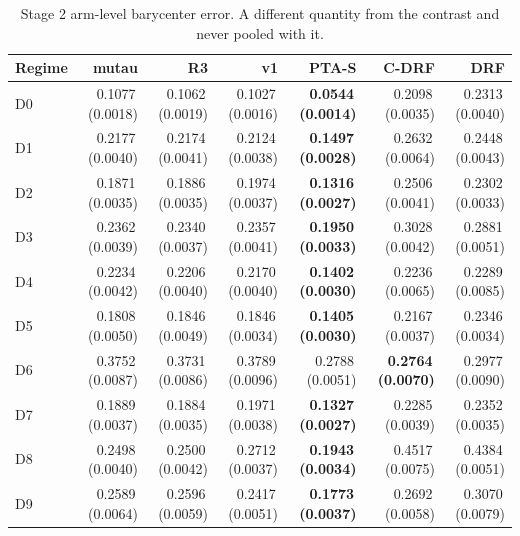 \begin{table}[htbp]
\centering
\caption{Stage 2 arm-level barycenter error. A different quantity from the contrast and never pooled with it.}
\label{tab:p55s2-bary}
\scriptsize
\setlength{\tabcolsep}{3.2pt}
\begin{tabular}{@{}lrrrrrr@{}}
\toprule
Regime & mutau & R3 & v1 & PTA-S & C-DRF & DRF \\
\midrule
D0 & 0.1077\,(0.0018) & 0.1062\,(0.0019) & 0.1027\,(0.0016) & \textbf{0.0544\,(0.0014)} & 0.2098\,(0.0035) & 0.2313\,(0.0040) \\
D1 & 0.2177\,(0.0040) & 0.2174\,(0.0041) & 0.2124\,(0.0038) & \textbf{0.1497\,(0.0028)} & 0.2632\,(0.0064) & 0.2448\,(0.0043) \\
D2 & 0.1871\,(0.0035) & 0.1886\,(0.0035) & 0.1974\,(0.0037) & \textbf{0.1316\,(0.0027)} & 0.2506\,(0.0041) & 0.2302\,(0.0033) \\
D3 & 0.2362\,(0.0039) & 0.2340\,(0.0037) & 0.2357\,(0.0041) & \textbf{0.1950\,(0.0033)} & 0.3028\,(0.0042) & 0.2881\,(0.0051) \\
D4 & 0.2234\,(0.0042) & 0.2206\,(0.0040) & 0.2170\,(0.0040) & \textbf{0.1402\,(0.0030)} & 0.2236\,(0.0065) & 0.2289\,(0.0085) \\
D5 & 0.1808\,(0.0050) & 0.1846\,(0.0049) & 0.1846\,(0.0034) & \textbf{0.1405\,(0.0030)} & 0.2167\,(0.0037) & 0.2346\,(0.0034) \\
D6 & 0.3752\,(0.0087) & 0.3731\,(0.0086) & 0.3789\,(0.0096) & 0.2788\,(0.0051) & \textbf{0.2764\,(0.0070)} & 0.2977\,(0.0090) \\
D7 & 0.1889\,(0.0037) & 0.1884\,(0.0035) & 0.1971\,(0.0038) & \textbf{0.1327\,(0.0027)} & 0.2285\,(0.0039) & 0.2352\,(0.0035) \\
D8 & 0.2498\,(0.0040) & 0.2500\,(0.0042) & 0.2712\,(0.0037) & \textbf{0.1943\,(0.0034)} & 0.4517\,(0.0075) & 0.4384\,(0.0051) \\
D9 & 0.2589\,(0.0064) & 0.2596\,(0.0059) & 0.2417\,(0.0051) & \textbf{0.1773\,(0.0037)} & 0.2692\,(0.0058) & 0.3070\,(0.0079) \\
\bottomrule
\end{tabular}
\end{table}

